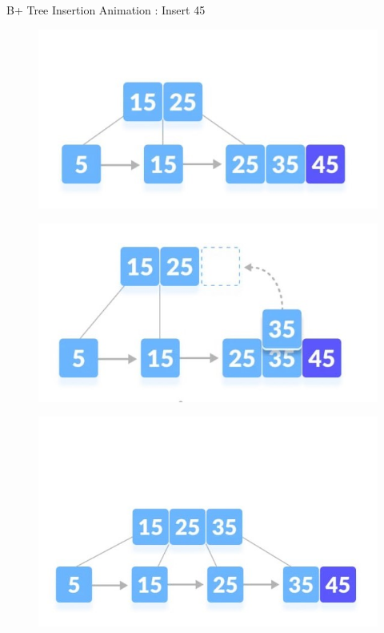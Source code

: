 \documentclass{beamer}
\begin{document}
\begin{frame}{B+ Tree Insertion Animation : \alert{Insert 45}}
    \begin{table}[h]
        \centering
        \begin{overprint}
        \begin{figure}
       
            \centering
            \includegraphics[scale=0.8]{Images/bi5_1_1.jpg}
        \end{figure}
        \begin{figure}
            \centering
            \includegraphics[scale=0.8]{Images/bi5_1_2.jpg}
        \end{figure}
        \begin{figure}
            \centering
            \includegraphics[scale=0.8]{Images/bi5_2_1.jpg}

\end{figure}
\end{overprint}
\end{table}
\end{frame}
\end{document}
